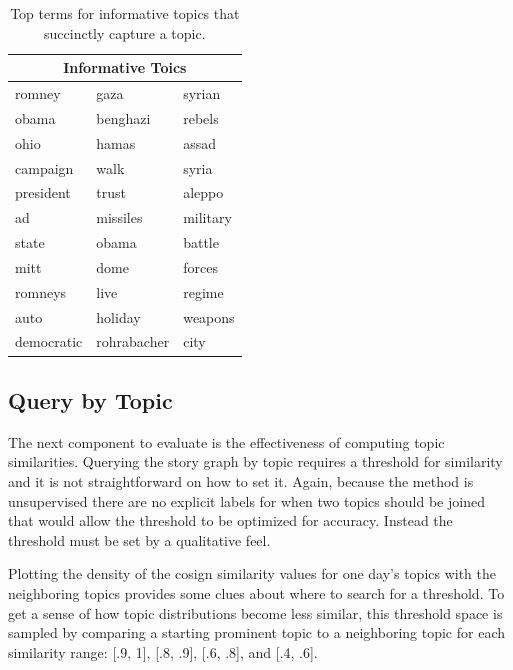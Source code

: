 \documentclass[10pt,twocolumn]{article}
\begin{document}
\begin{table}
\begin{center}
\begin{tabular}{|l|l|l|}
  \hline
  \multicolumn{3}{|c|}{Informative Toics} \\
  \hline
romney & gaza & syrian \\
obama & benghazi & rebels \\ 
ohio & hamas & assad \\
campaign & walk & syria \\ 
president & trust & aleppo \\
ad & missiles & military \\
state & obama &  battle \\
mitt & dome & forces \\
romneys & live & regime \\
auto & holiday & weapons \\
democratic & rohrabacher & city \\
  \hline
\end{tabular}
\caption*{Top terms for informative topics that succinctly capture a topic.}
\end{center}
\end{table}

\subsection {Query by Topic}
The next component to evaluate is the effectiveness of computing topic similarities.  Querying the story graph by topic requires a threshold for similarity and it is not straightforward on how to set it.  Again, because the method is unsupervised there are no explicit labels for when two topics should be joined that would allow the threshold to be optimized for accuracy.   Instead the threshold must be set by a qualitative feel.

Plotting the density of the cosign similarity values for one day's topics with the neighboring topics provides some clues about where to search for a threshold.  To get a sense of how topic distributions become less similar, this threshold space is sampled by comparing a starting prominent topic to a neighboring topic for each similarity range: [.9, 1], [.8, .9], [.6, .8], and [.4, .6].
\end{document}

